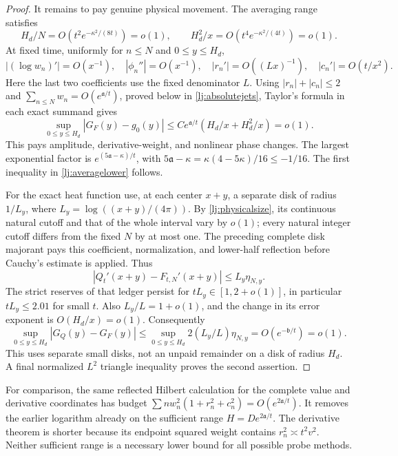 \documentclass[11pt]{article}
\numberwithin{equation}{section}
\theoremstyle{definition}
\theoremstyle{remark}
\begin{document}
\begin{proof}
It remains to pay genuine physical movement. The averaging range satisfies
\begin{equation}\label{lj:physicalsize}
 H_d/N=O(t^2e^{-\kappa^2/(8t)})=o(1),\qquad
 H_d^2/x=O(t^4e^{-\kappa^2/(4t)})=o(1).
\end{equation}
At fixed time, uniformly for \(n\le N\) and \(0\le y\le H_d\),
\[
 |(\log w_n)'|=O(x^{-1}),\quad
 |\phi_n''|=O(x^{-1}),\quad
 |r_n'|=O((Lx)^{-1}),\quad |c_n'|=O(t/x^2).
\]
Here the last two coefficients use the fixed denominator \(L\).
Using \(|r_n|+|c_n|\le2\) and
\(\sum_{n\le N}w_n=O(e^{\mathfrak a/t})\), proved below in
\eqref{lj:absolutejets}, Taylor's formula in each exact summand gives
\begin{equation}\label{lj:movement}
 \sup_{0\le y\le H_d}|G_F(y)-g_0(y)|
 \le C e^{\mathfrak a/t}(H_d/x+H_d^2/x)=o(1).
\end{equation}
This pays amplitude, derivative-weight, and nonlinear phase changes.
The largest exponential factor is
\(e^{(5\mathfrak a-\kappa)/t}\), with
\(5\mathfrak a-\kappa=\kappa(4-5\kappa)/16\le-1/16\).
The first inequality in \eqref{lj:averagelower} follows.

For the exact heat function use, at each center \(x+y\), a separate
disk of radius \(1/L_y\), where \(L_y=\log((x+y)/(4\pi))\).
By \eqref{lj:physicalsize}, its continuous natural cutoff and that of
the whole interval vary by \(o(1)\); every natural integer cutoff
differs from the fixed \(N\) by at most one. The preceding complete
disk majorant pays this coefficient, normalization, and lower-half
reflection before Cauchy's estimate is applied. Thus
\[
 |Q_t'(x+y)-F_{t,N}'(x+y)|\le L_y\eta_{N,y}.
\]
The strict reserves of that ledger persist for
\(tL_y\in[1,2+o(1)]\), in particular \(tL_y\le2.01\) for small \(t\).
Also \(L_y/L=1+o(1)\), and the change in its error exponent is
\(O(H_d/x)=o(1)\). Consequently
\begin{equation}\label{lj:physicalcauchy}
 \sup_{0\le y\le H_d}|G_Q(y)-G_F(y)|
 \le\sup_{0\le y\le H_d}2(L_y/L)\eta_{N,y}
                  =O(e^{-\mathfrak b/t})=o(1).
\end{equation}
This uses separate small disks, not an unpaid remainder on a disk of
radius \(H_d\). A final normalized \(L^2\) triangle inequality proves
the second assertion.
\end{proof}

For comparison, the same reflected Hilbert calculation for the complete
value and derivative coordinates has budget
\(\sum nw_n^2(1+r_n^2+c_n^2)=O(e^{2\mathfrak a/t})\).
It removes the earlier logarithm already on the sufficient range
\(H=De^{2\mathfrak a/t}\). The derivative theorem is shorter because
its endpoint squared weight contains \(r_n^2\asymp t^2v^2\).
Neither sufficient range is a necessary lower bound for all possible
probe methods.
\end{document}
